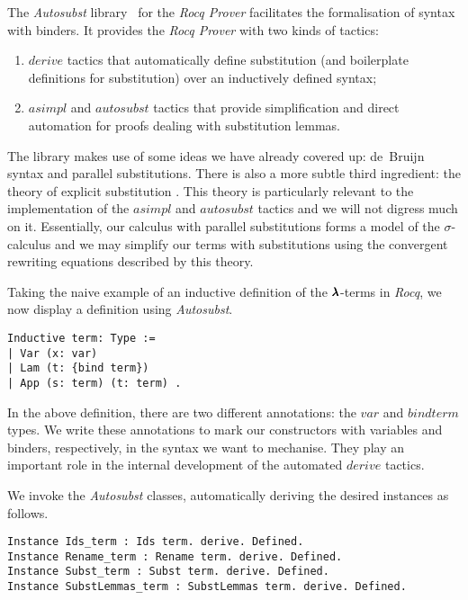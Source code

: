The \textit{Autosubst} library~\cite{AutosubstSchafer,AutosubstManual} for the \textit{Rocq Prover} facilitates the formalisation of syntax with binders.
It provides the \textit{Rocq Prover} with two kinds of tactics:
\begin{enumerate}
  \item \lst$derive$ tactics that automatically define substitution (and boilerplate definitions for substitution) over an inductively defined syntax;
  \item \lst$asimpl$ and \lst$autosubst$ tactics that provide simplification and direct automation for proofs dealing with substitution lemmas.
\end{enumerate}

The library makes use of some ideas we have already covered up: de~Bruijn syntax and parallel substitutions.
There is also a more subtle third ingredient: the theory of explicit substitution \cite{Abadi}.
This theory is particularly relevant to the implementation of the \lst$asimpl$ and \lst$autosubst$ tactics and we will not digress much on it.
Essentially, our calculus with parallel substitutions forms a model of the $\sigma$-calculus and we may simplify our terms with substitutions using the convergent rewriting equations described by this theory.

Taking the naive example of an inductive definition of the $\pmb{\lambda}$-terms in \textit{Rocq}, we now display a definition using \textit{Autosubst}.

\begin{lstlisting}[language=Coq]
Inductive term: Type :=
| Var (x: var)
| Lam (t: {bind term})
| App (s: term) (t: term) .
\end{lstlisting}

In the above definition, there are two different annotations: the \lst$var$ and \lst${bind term}$ types.
We write these annotations to mark our constructors with variables and binders, respectively, in the syntax we want to mechanise.
They play an important role in the internal development of the automated \lst$derive$ tactics.

We invoke the \textit{Autosubst} classes, automatically deriving the desired instances as follows.

\begin{lstlisting}[language=Coq]
Instance Ids_term : Ids term. derive. Defined.
Instance Rename_term : Rename term. derive. Defined.
Instance Subst_term : Subst term. derive. Defined.
Instance SubstLemmas_term : SubstLemmas term. derive. Defined.
\end{lstlisting}

